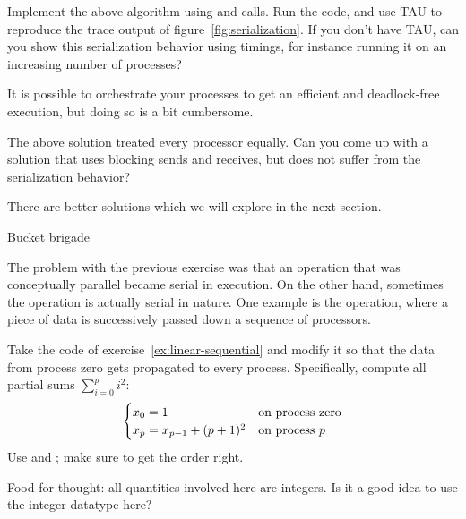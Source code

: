 \begin{exercise}
  \label{ex:linear-sequential}
  Implement the above algorithm using  and  calls.
  Run the code, and use TAU to reproduce the trace output 
  of figure~\ref{fig:serialization}.
  If you don't have TAU, can you show this serialization
  behavior using timings, for instance running it on an increasing number of processes?
\end{exercise}

It is possible to orchestrate your processes to get an efficient and
deadlock-free execution, but doing so is a bit cumbersome.

\begin{exercise}
  The above solution treated every processor equally. Can you come up
  with a solution that uses blocking sends and receives, but does not
  suffer from the serialization behavior?
\end{exercise}

There are better solutions which we will
explore in the next section.

 {Bucket brigade}
\label{sec:bucketbrigade}

The problem with the previous exercise was that an operation that was
conceptually parallel became serial in execution. On the other hand,
sometimes the operation is actually serial in nature. One example is
the  operation, where a piece of data is
successively passed down a sequence of processors.

\begin{exercise}
  \label{ex:bucket-block}
  Take the code of exercise~\ref{ex:linear-sequential} and modify it
  so that the data from process zero gets propagated to every
  process. Specifically, compute all partial sums $\sum_{i=0}^pi^2$:
  \[ 
  \begin{cases}
    x_0 = 1&\hbox{on process zero}\\
    x_p = x_{p-1}+(p+1)^2 & \hbox{on process $p$}\\
  \end{cases}
  \]
  Use  and ; make sure to get the order right.

  Food for thought: all quantities involved here are integers. Is it a good idea to
  use the integer datatype here?

\end{exercise}

